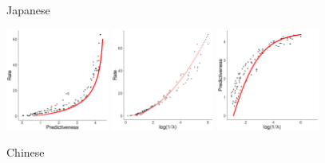 \documentclass[11pt,letterpaper]{article}
\begin{document}
\begin{figure}
	\begin{center}
	Japanese

\includegraphics[width=0.3\textwidth]{code/figures/LDC95T8-words-info-fitted.pdf}
\includegraphics[width=0.3\textwidth]{code/figures/LDC95T8-words-nlogbeta-mem-fitted.pdf}
\includegraphics[width=0.3\textwidth]{code/figures/LDC95T8-words-nlogbeta-ee-fitted.pdf}

		Chinese


\end{center}
\end{figure}
\end{document}
